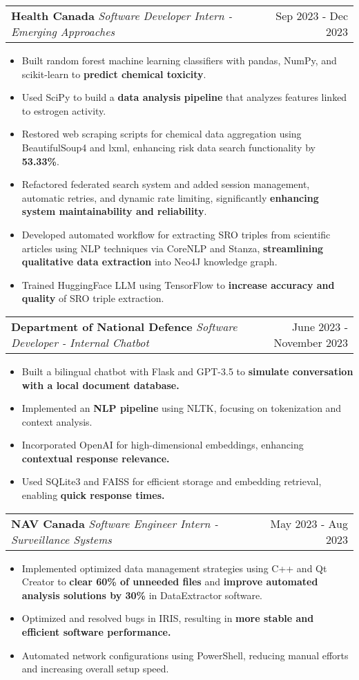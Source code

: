 \documentclass[letterpaper,11pt]{article}
\makeatletter
\newcommand{\resumeItem}[1]{
  \item\small{
    {#1 \vspace{-2pt}}
  }
}
\newcommand{\resumeSubheading}[3]{
    \item
    \begin{tabular*}{0.97\textwidth}[t]{l@{\extracolsep{\fill}}r}
      \textbf{#1} \textbar \textit{ #2} & #3 \\
    \end{tabular*}\vspace{-4.5pt}
}
\newcommand{\resumeItemListStart}{\begin{itemize}}
\newcommand{\resumeItemListEnd}{\end{itemize}\vspace{-5pt}}
\makeatother
\begin{document}
    \resumeSubheading
      {Health Canada}{Software Developer Intern - Emerging Approaches}{Sep 2023 - Dec 2023}
      \resumeItemListStart
        \resumeItem{Built random forest machine learning classifiers with pandas, NumPy, and scikit-learn to \textbf{predict chemical toxicity}.}
        \resumeItem{Used SciPy to build a \textbf{data analysis pipeline} that analyzes features linked to estrogen activity.}
        \resumeItem{Restored web scraping scripts for chemical data aggregation using BeautifulSoup4 and lxml, enhancing risk data search functionality by \textbf{53.33\%}.}
        \resumeItem{Refactored federated search system and added session management, automatic retries, and dynamic rate limiting, significantly \textbf{enhancing system maintainability and reliability}.}
        \resumeItem{Developed automated workflow for extracting SRO triples from scientific articles using NLP techniques via CoreNLP and Stanza, \textbf{streamlining qualitative data extraction} into Neo4J knowledge graph.}
        \resumeItem{Trained HuggingFace LLM using TensorFlow to \textbf{increase accuracy and quality} of SRO triple extraction.}
      \resumeItemListEnd

    \resumeSubheading
    {Department of National Defence}{Software Developer - Internal Chatbot}{June 2023 - November 2023}
      \resumeItemListStart
        \resumeItem{Built a bilingual chatbot with Flask and GPT-3.5 to \textbf{simulate conversation with a local document database.}}
        \resumeItem{Implemented an \textbf{NLP pipeline} using NLTK, focusing on tokenization and context analysis.}
        \resumeItem{Incorporated OpenAI for high-dimensional embeddings, enhancing \textbf{contextual response relevance.}}
        \resumeItem{Used SQLite3 and FAISS for efficient storage and embedding retrieval, enabling \textbf{quick response times.}}
      \resumeItemListEnd

    \resumeSubheading
    {NAV Canada}{Software Engineer Intern - Surveillance Systems}{May 2023 - Aug 2023}
      \resumeItemListStart
        \resumeItem{Implemented optimized data management strategies using C++ and Qt Creator to \textbf{clear 60\% of unneeded files} and \textbf{improve automated analysis solutions by 30\%} in DataExtractor software.}
        \resumeItem{Optimized and resolved bugs in IRIS, resulting in \textbf{more stable and efficient software performance.}}
        \resumeItem{Automated network configurations using PowerShell, reducing manual efforts and increasing overall setup speed.}
      \resumeItemListEnd
\end{document}
